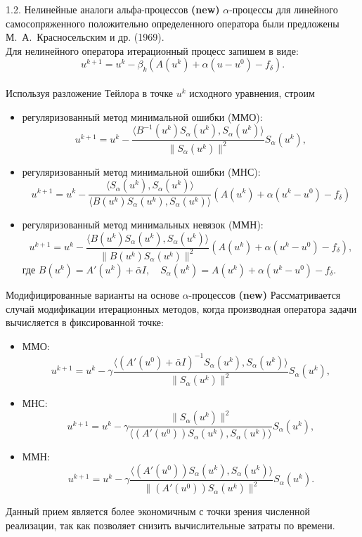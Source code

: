 \documentclass[10pt,pdf, mathserif, hyperref={unicode}]{beamer}
\begin{document}
\begin{frame}{1.2. Нелинейные аналоги альфа-процессов \textbf{(new)}}
	$\alpha$-процессы для линейного  самосопряженного положительно определенного оператора  были предложены {\color{red}М.~А.~Красносельским и др. (1969)}. \\
	Для нелинейного оператора итерационный процесс запишем в виде:
	$$u^{k+1}=u^k-\beta_k(A(u^k)+\alpha(u-u^0)-f_{\delta}).$$ \\
	Используя разложение Тейлора в точке $u^k$ исходного уравнения, строим
	\begin{itemize}
		\item регуляризованный метод минимальной ошибки (ММО): $$u^{k+1} =u^k - \frac{\langle B^{-1}(u^k)S_\alpha(u^k), S_\alpha (u^k)\rangle}{\|S_\alpha(u^k)\|^2}S_\alpha(u^k),$$
		\item регуляризованный метод минимальной ошибки (МНС):
		$$u^{k+1} =u^k - \frac{\langle S_\alpha(u^k), S_\alpha (u^k)\rangle}{\langle B(u^k)S_\alpha(u^k), S_\alpha(u^k)\rangle}(A(u^k)+\alpha(u^k-u^0)-f_\delta)$$
		\item регуляризованный метод минимальных невязок (ММН):
		$$u^{k+1} =u^k - \frac{\langle B(u^k)S_\alpha(u^k), S_\alpha (u^k)\rangle}{\|B(u^k)S_\alpha(u^k)\|^2}(A(u^k)+\alpha(u^k-u^0)-f_\delta),$$
		где $B(u^k)=A'(u^k)+\bar{\alpha}I, \quad S_\alpha(u^k)=A(u^k)+\alpha(u^k-u^0)-f_\delta$.
	\end{itemize}
\end{frame}
\begin{frame}{ Модифицированные варианты на основе $\alpha$-процессов \textbf{(new)}}
	Рассматривается случай модификации итерационных методов, когда производная оператора задачи вычисляется 
        в фиксированной точке:
	\begin{itemize}
		\item ММО: $$u^{k+1}=u^k-\gamma\frac{\big\langle(A'(u^0)+\bar{\alpha}I)^{-1}S_\alpha(u^k),S_\alpha(u^k)\big\rangle}{\|S_\alpha(u^k)\|^2}S_\alpha(u^k),$$
		\item МНС:
		$$u^{k+1}=u^k-\gamma\frac{\|S_\alpha(u^k)\|^2}{\big\langle(A'(u^0))S_\alpha(u^k), S_\alpha(u^k)\big\rangle}S_\alpha(u^k),$$
		\item ММН:
		$$u^{k+1}=u^k-\gamma\frac{\big\langle(A'(u^0))S_\alpha(u^k), S_\alpha(u^k)\big\rangle}{\|(A'(u^0))S_\alpha(u^k)\|^2}S_\alpha(u^k).$$
	\end{itemize}
	
	\smallskip
	Данный прием является более экономичным с точки зрения численной реализации, так как позволяет снизить вычислительные затраты по времени.
\end{frame}
\end{document}
